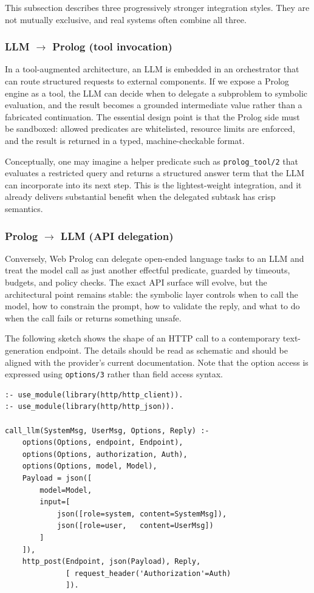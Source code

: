 This subsection describes three progressively stronger integration styles. They are not mutually exclusive, and real systems often combine all three.

\subsubsection{LLM $\rightarrow$ Prolog (tool invocation)}

In a tool-augmented architecture, an LLM is embedded in an orchestrator that can route structured requests to external components. If we expose a Prolog engine as a tool, the LLM can decide when to delegate a subproblem to symbolic evaluation, and the result becomes a grounded intermediate value rather than a fabricated continuation. The essential design point is that the Prolog side must be sandboxed: allowed predicates are whitelisted, resource limits are enforced, and the result is returned in a typed, machine-checkable format.

Conceptually, one may imagine a helper predicate such as \texttt{prolog\_tool/2} that evaluates a restricted query and returns a structured answer term that the LLM can incorporate into its next step. This is the lightest-weight integration, and it already delivers substantial benefit when the delegated subtask has crisp semantics.

\subsubsection{Prolog $\rightarrow$ LLM (API delegation)}

Conversely, Web Prolog can delegate open-ended language tasks to an LLM and treat the model call as just another effectful predicate, guarded by timeouts, budgets, and policy checks. The exact API surface will evolve, but the architectural point remains stable: the symbolic layer controls when to call the model, how to constrain the prompt, how to validate the reply, and what to do when the call fails or returns something unsafe.

The following sketch shows the shape of an HTTP call to a contemporary text-generation endpoint. The details should be read as schematic and should be aligned with the provider's current documentation. Note that the option access is expressed using \texttt{options/3} rather than field access syntax.

\begin{verbatim}
:- use_module(library(http/http_client)).
:- use_module(library(http/http_json)).

call_llm(SystemMsg, UserMsg, Options, Reply) :-
    options(Options, endpoint, Endpoint),
    options(Options, authorization, Auth),
    options(Options, model, Model),
    Payload = json([
        model=Model,
        input=[
            json([role=system, content=SystemMsg]),
            json([role=user,   content=UserMsg])
        ]
    ]),
    http_post(Endpoint, json(Payload), Reply,
              [ request_header('Authorization'=Auth)
              ]).
\end{verbatim}

